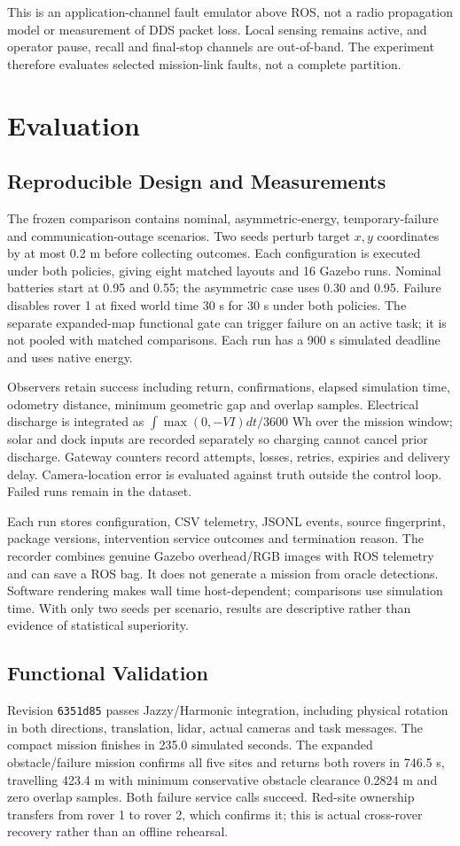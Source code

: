 \documentclass[conference]{IEEEtran}
\begin{document}
This is an application-channel fault emulator above ROS, not a radio propagation
model or measurement of DDS packet loss. Local sensing remains active, and
operator pause, recall and final-stop channels are out-of-band. The experiment
therefore evaluates selected mission-link faults, not a complete partition.

\section{Evaluation}
\subsection{Reproducible Design and Measurements}
The frozen comparison contains nominal, asymmetric-energy, temporary-failure
and communication-outage scenarios. Two seeds perturb target $x,y$ coordinates
by at most 0.2 m before collecting outcomes. Each configuration is executed
under both policies, giving eight matched layouts and 16 Gazebo runs.
Nominal batteries start at 0.95 and 0.55; the asymmetric case uses 0.30 and 0.95.
Failure disables rover 1 at fixed world time 30 s for 30 s under both policies.
The separate expanded-map functional gate can trigger failure on an active task;
it is not pooled with matched comparisons. Each run has a 900 s simulated
deadline and uses native energy.

Observers retain success including return, confirmations, elapsed simulation
time, odometry distance, minimum geometric gap and overlap samples. Electrical
discharge is integrated as $\int\max(0,-VI)dt/3600$ Wh over the mission window;
solar and dock inputs are recorded separately so charging cannot cancel prior
discharge. Gateway counters record attempts, losses, retries, expiries and
delivery delay. Camera-location error is evaluated against truth outside the
control loop. Failed runs remain in the dataset.

Each run stores configuration, CSV telemetry, JSONL events, source fingerprint,
package versions, intervention service outcomes and termination reason.
The recorder combines genuine Gazebo overhead/RGB images with ROS telemetry
and can save a ROS bag. It does not generate a mission from oracle detections.
Software rendering makes wall time host-dependent; comparisons use simulation
time. With only two seeds per scenario, results are descriptive rather than
evidence of statistical superiority.

\subsection{Functional Validation}
Revision \texttt{6351d85} passes Jazzy/Harmonic integration, including physical
rotation in both directions, translation, lidar, actual cameras and task
messages. The compact mission finishes in 235.0 simulated seconds. The expanded
obstacle/failure mission confirms all five sites and returns both rovers in
746.5 s, travelling 423.4 m with minimum conservative obstacle clearance
0.2824 m and zero overlap samples. Both failure service calls succeed. Red-site
ownership transfers from rover 1 to rover 2, which confirms it; this is actual
cross-rover recovery rather than an offline rehearsal.
\end{document}
